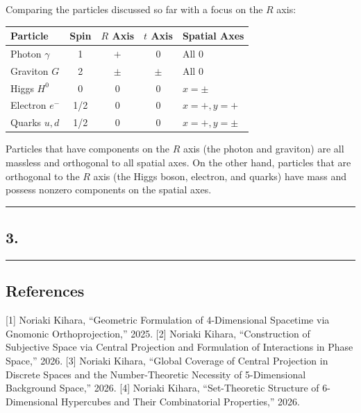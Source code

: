 \documentclass[
  a4paper,11pt]{article}
\newcounter{none}
\theoremstyle{definition}
\theoremstyle{remark}
\begin{document}
Comparing the particles discussed so far with a focus on the \(R\) axis:

{\def\LTcaptype{none} %
\begin{longtable}[]{@{}lcccl@{}}
\toprule\noalign{}
Particle & Spin & \(R\) Axis & \(t\) Axis & Spatial Axes \\
\midrule\noalign{}
\endhead
\bottomrule\noalign{}
\endlastfoot
Photon \(\gamma\) & 1 & \(+\) & \(0\) & All \(0\) \\
Graviton \(G\) & 2 & \(\pm\) & \(\pm\) & All \(0\) \\
Higgs \(H^0\) & 0 & \(0\) & \(0\) & \(x = \pm\) \\
Electron \(e^-\) & 1/2 & \(0\) & \(0\) & \(x = +, y = +\) \\
Quarks \(u, d\) & 1/2 & \(0\) & \(0\) & \(x = +, y = \pm\) \\
\end{longtable}
}

Particles that have components on the \(R\) axis (the photon and
graviton) are all massless and orthogonal to all spatial axes. On the
other hand, particles that are orthogonal to the \(R\) axis (the Higgs
boson, electron, and quarks) have mass and possess nonzero components on
the spatial axes.

\begin{center}\rule{0.5\linewidth}{0.5pt}\end{center}

\subsection{3.}\label{section}

\begin{center}\rule{0.5\linewidth}{0.5pt}\end{center}

\subsection{References}\label{references}

{[}1{]} Noriaki Kihara, ``Geometric Formulation of 4-Dimensional
Spacetime via Gnomonic Orthoprojection,'' 2025. {[}2{]} Noriaki Kihara,
``Construction of Subjective Space via Central Projection and
Formulation of Interactions in Phase Space,'' 2026. {[}3{]} Noriaki
Kihara, ``Global Coverage of Central Projection in Discrete Spaces and
the Number-Theoretic Necessity of 5-Dimensional Background Space,''
2026. {[}4{]} Noriaki Kihara, ``Set-Theoretic Structure of 6-Dimensional
Hypercubes and Their Combinatorial Properties,'' 2026.
\end{document}
